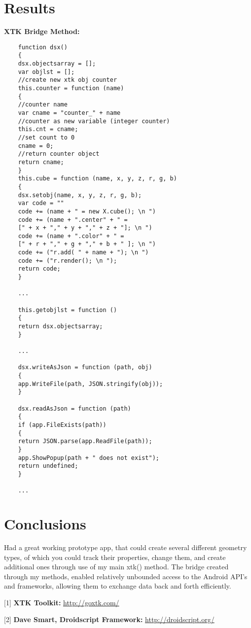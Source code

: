 \documentclass[sigconf]{acmart}
\begin{document}
    \section{Results}
    
    \vspace{0.09 cm}
    
    \textbf{XTK Bridge Method:}
    
    \begin{verbatim}
    function dsx()
    {
    dsx.objectsarray = [];
    var objlst = [];
    //create new xtk obj counter
    this.counter = function (name)
    {
    //counter name
    var cname = "counter_" + name
    //counter as new variable (integer counter)
    this.cnt = cname;
    //set count to 0
    cname = 0;
    //return counter object
    return cname;
    }
    this.cube = function (name, x, y, z, r, g, b)
    {
    dsx.setobj(name, x, y, z, r, g, b);
    var code = ""
    code += (name + " = new X.cube(); \n ")
    code += (name + ".center" + " = 
    [" + x + "," + y + "," + z + "]; \n ")
    code += (name + ".color" + " = 
    [" + r + "," + g + "," + b + " ]; \n ")
    code += ("r.add( " + name + "); \n ")
    code += ("r.render(); \n ");
    return code;
    }
    
    ...
    
    this.getobjlst = function ()
    {
    return dsx.objectsarray;
    }
    
    ...
    
    dsx.writeAsJson = function (path, obj)
    {
    app.WriteFile(path, JSON.stringify(obj));
    }
    
    dsx.readAsJson = function (path)
    {
    if (app.FileExists(path))
    {
    return JSON.parse(app.ReadFile(path));
    }
    app.ShowPopup(path + " does not exist");
    return undefined;
    }
    
    ...
    \end{verbatim}
    
    \section{Conclusions}
    Had a great working prototype app, that could create several different geometry types, of which you could track their properties, change them, and create additional ones through use of my main xtk() method. The bridge created through my methods, enabled relatively unbounded access to the Android API's and frameworks, allowing them to exchange data back and forth efficiently.
    
    
    \biblioht
    
    
    [1] \textbf{XTK Toolkit:   }   \hyperlink{http://goxtk.com}{http://goxtk.com/}
    
    [2] \textbf{Dave Smart, Droidscript Framework:    }   \hyperlink{http://droidscript.org/}{http://droidscript.org/}
    
    
\end{document}
